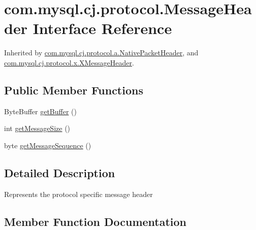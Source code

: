 \hypertarget{interfacecom_1_1mysql_1_1cj_1_1protocol_1_1_message_header}{}\section{com.\+mysql.\+cj.\+protocol.\+Message\+Header Interface Reference}
\label{interfacecom_1_1mysql_1_1cj_1_1protocol_1_1_message_header}


Inherited by \mbox{\hyperlink{classcom_1_1mysql_1_1cj_1_1protocol_1_1a_1_1_native_packet_header}{com.\+mysql.\+cj.\+protocol.\+a.\+Native\+Packet\+Header}}, and \mbox{\hyperlink{classcom_1_1mysql_1_1cj_1_1protocol_1_1x_1_1_x_message_header}{com.\+mysql.\+cj.\+protocol.\+x.\+X\+Message\+Header}}.

\subsection*{Public Member Functions}
\begin{DoxyCompactItemize}
\item 
Byte\+Buffer \mbox{\hyperlink{interfacecom_1_1mysql_1_1cj_1_1protocol_1_1_message_header_a623366dac16a7c2c5a879588afc4ed92}{get\+Buffer}} ()
\item 
int \mbox{\hyperlink{interfacecom_1_1mysql_1_1cj_1_1protocol_1_1_message_header_a8192e2c73dd6c3ed31e569034950f163}{get\+Message\+Size}} ()
\item 
byte \mbox{\hyperlink{interfacecom_1_1mysql_1_1cj_1_1protocol_1_1_message_header_addc9db095cb10062d2a3b0e3ad180750}{get\+Message\+Sequence}} ()
\end{DoxyCompactItemize}


\subsection{Detailed Description}
Represents the protocol specific message header 

\subsection{Member Function Documentation}
\mbox{\label{interfacecom_1_1mysql_1_1cj_1_1protocol_1_1_message_header_a623366dac16a7c2c5a879588afc4ed92}} 
